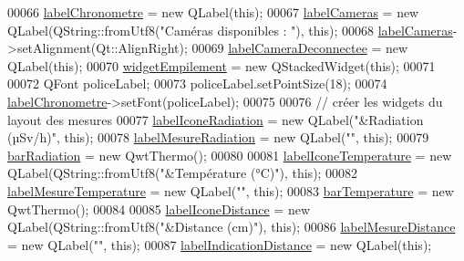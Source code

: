 \begin{DoxyCode}
00066     \hyperlink{class_i_h_m_rov_a32e5cb80ecae7bad6914c690ebd93995}{labelChronometre} = \textcolor{keyword}{new} QLabel(\textcolor{keyword}{this});
00067     \hyperlink{class_i_h_m_rov_aebce213bf418897dc8a775cfc180ff59}{labelCameras} = \textcolor{keyword}{new} QLabel(QString::fromUtf8(\textcolor{stringliteral}{"Caméras disponibles : "}), \textcolor{keyword}{this});
00068     \hyperlink{class_i_h_m_rov_aebce213bf418897dc8a775cfc180ff59}{labelCameras}->setAlignment(Qt::AlignRight);
00069     \hyperlink{class_i_h_m_rov_ac3b86335f9903c2a71eafe941d5c302b}{labelCameraDeconnectee} = \textcolor{keyword}{new} QLabel(\textcolor{keyword}{this});
00070     \hyperlink{class_i_h_m_rov_a238e50788d62ae2c34b4ae6c8082d596}{widgetEmpilement} = \textcolor{keyword}{new} QStackedWidget(\textcolor{keyword}{this});
00071 
00072     QFont policeLabel;
00073     policeLabel.setPointSize(18);
00074     \hyperlink{class_i_h_m_rov_a32e5cb80ecae7bad6914c690ebd93995}{labelChronometre}->setFont(policeLabel);
00075 
00076     \textcolor{comment}{// créer les widgets du layout des mesures}
00077     \hyperlink{class_i_h_m_rov_a29246e2035e7b3915a59614eb4802548}{labelIconeRadiation} = \textcolor{keyword}{new} QLabel(\textcolor{stringliteral}{"&Radiation (µSv/h)"}, \textcolor{keyword}{this});
00078     \hyperlink{class_i_h_m_rov_aaa9588a64c4af2f9fb08c62519a05c5a}{labelMesureRadiation} = \textcolor{keyword}{new} QLabel(\textcolor{stringliteral}{""}, \textcolor{keyword}{this});
00079     \hyperlink{class_i_h_m_rov_a06f0850e46f735c3418360280f6c8336}{barRadiation} = \textcolor{keyword}{new} QwtThermo();
00080 
00081     \hyperlink{class_i_h_m_rov_a0404f03611d3942e7459ee431f05224c}{labelIconeTemperature} = \textcolor{keyword}{new} QLabel(QString::fromUtf8(\textcolor{stringliteral}{"&Température (°C)"}), \textcolor{keyword}{this});
00082     \hyperlink{class_i_h_m_rov_ade64349f20dac7adccee4d4fbc04e6e8}{labelMesureTemperature} = \textcolor{keyword}{new} QLabel(\textcolor{stringliteral}{""}, \textcolor{keyword}{this});
00083     \hyperlink{class_i_h_m_rov_aa89397963e5889e2f911bed5112772cb}{barTemperature} = \textcolor{keyword}{new} QwtThermo();
00084 
00085     \hyperlink{class_i_h_m_rov_ae8e7eef50b55104e1490191e3bdcb8d9}{labelIconeDistance} = \textcolor{keyword}{new} QLabel(QString::fromUtf8(\textcolor{stringliteral}{"&Distance (cm)"}), \textcolor{keyword}{this});
00086     \hyperlink{class_i_h_m_rov_a39ff04b1880aa20941716cf7a6e1b8d8}{labelMesureDistance} = \textcolor{keyword}{new} QLabel(\textcolor{stringliteral}{""}, \textcolor{keyword}{this});
00087     \hyperlink{class_i_h_m_rov_a14e8fc8b6a1f95e974b550fd54088581}{labelIndicationDistance} = \textcolor{keyword}{new} QLabel(\textcolor{keyword}{this});

\end{DoxyCode}
